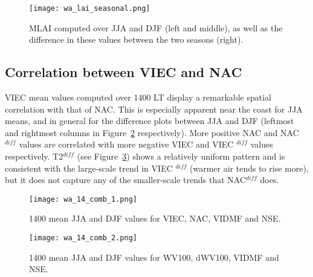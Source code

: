 \begin{figure}[!ht]
	\centering
	\texttt{[image: wa\_lai\_seasonal.png]}
	\caption[MLAI seasonal comparison for WA focus region]{\ac{MLAI} computed over \acs{JJA} and \acs{DJF} (left and middle), as well as the difference in these values between the two seasons (right).}
	\label{fig:wa_lai_seasonal}
\end{figure}

\subsection{Correlation between VIEC and NAC}

\ac{VIEC} mean values computed over 1400 \ac{LT} display a remarkable spatial correlation with that of \ac{NAC}. This is especially apparent near the coast for \ac{JJA} means, and in general for the difference plots between \ac{JJA} and \ac{DJF} (leftmost and rightmost columns in Figure~\ref{fig:wa_14_comb_1} respectively). More positive \ac{NAC} and \ac{NAC}$^{diff}$ values are correlated with more negative \ac{VIEC} and \ac{VIEC} $^{diff}$ values respectively. \ac{T2}$^{diff}$ (see Figure~\ref{fig:wa_14_comb_2}) shows a relatively uniform pattern and is consistent with the large-scale trend in \ac{VIEC} $^{diff}$ (warmer air tends to rise more), but it does not capture any of the smaller-scale trends that \ac{NAC}$^{diff}$ does.

\begin{figure}[!htp]
	\centering
	\texttt{[image: wa\_14\_comb\_1.png]}
	\caption[1400 means for selected variables 1]{1400 mean \acs{JJA} and \acs{DJF} values for \acs{VIEC}, \acs{NAC}, \acs{VIDMF} and \acs{NSE}.}
	\label{fig:wa_14_comb_1}
\end{figure}

\begin{figure}[!htp]
	\centering
	\texttt{[image: wa\_14\_comb\_2.png]}
	\caption[1400 means for selected variables 2]{1400 mean \acs{JJA} and \acs{DJF} values for \acs{WV100}, \acs{dWV100}, \acs{VIDMF} and \acs{NSE}.}
	\label{fig:wa_14_comb_2}
\end{figure}

